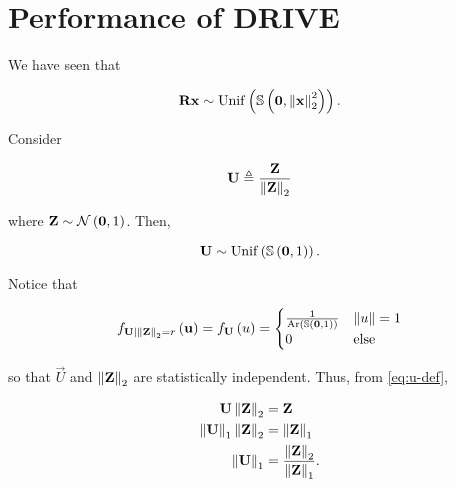 \documentclass[twoside]{article}
\begin{document}



\section{Performance of DRIVE}

We have seen that

\begin{equation}
    \vec{Rx} \sim \mathrm{Unif}\brak{\bS\brak{\vec{0},\norm{\vec{x}}_2^2}}.
    \label{eq:rx-dis}
\end{equation}

Consider 

\begin{equation}
    \vec{U} \triangleq \frac{\vec{Z}}{\norm{\vec{Z}}_2}
    \label{eq:u-def}
\end{equation}

where \(\boldsymbol{\mathbf{Z}}\sim\mathcal N\left(\boldsymbol{\mathbf{0}},1\right)\). Then,

\begin{equation}
    \vec{U} \sim \mathrm{Unif}\brak{\bS\brak{\vec{0},1}}.
    \label{eq:u-pdf}
\end{equation}

Notice that

\begin{equation}
    f_{\vec{U}|\norm{\vec{Z}}_2=r}\brak{\vec{u}} =  f_{\vec{U}}\brak{u} =
    \begin{cases}
        \frac{1}{\mathrm{Ar}\brak{\bS\brak{\vec{0},1}}} & \norm{u} = 1 \\
        0 & \mathrm{else}
    \end{cases}
    \label{eq:uz-ind}
\end{equation}

so that \(\vec{U}\) and \(\left\lVert\boldsymbol{\mathbf{Z}}\right\rVert_2\) are statistically independent.
Thus, from \eqref{eq:u-def},

\begin{align}
    \vec{U}\norm{\vec{Z}}_2 &= \vec{Z} \\
    \norm{\vec{U}}_1\norm{\vec{Z}}_2 &= \norm{\vec{Z}}_1 \\
    \norm{\vec{U}}_1 &= \frac{\norm{\vec{Z}}_2}{\norm{\vec{Z}}_1}.
    \label{eq:ul1-z}
\end{align}
\end{document}
